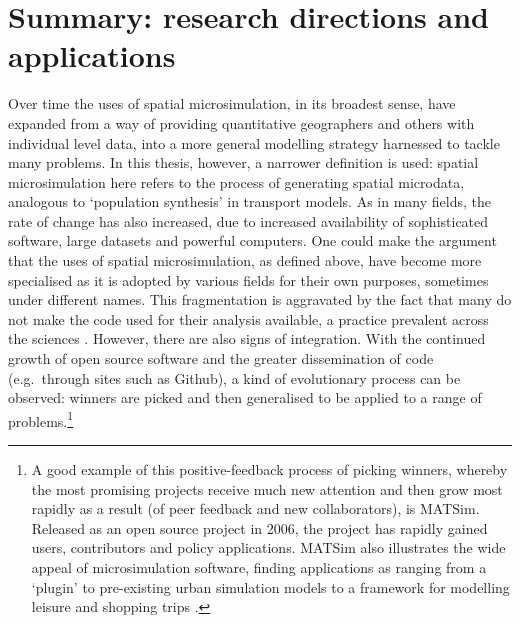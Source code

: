 \documentclass[a4paper, 11pt, twoside]{Thesis}
\begin{document}
\section{Summary: research directions and applications}
\label{s:bigdata-gps}
Over time the uses of spatial microsimulation, in its broadest sense,
have expanded from a way of
providing quantitative geographers and others with individual level data, into a more
general modelling strategy harnessed to tackle many problems.
In this thesis, however, a narrower definition is used:
spatial microsimulation here refers to the process of generating spatial
microdata, analogous to `population synthesis' in transport models.
As in many fields, the
rate of change has also increased, due to increased availability of
sophisticated software, large datasets and powerful
computers. One could make the argument that the
uses of spatial microsimulation, as defined above, have become more specialised
as it is adopted by various fields for their own purposes, sometimes under
different names. This fragmentation is aggravated by the fact that
many do not make the code used for their analysis available, a
practice prevalent across the sciences \citep{Ince2012}.
However, there are also signs of integration. With the continued growth of
open source software and the greater dissemination of code
(e.g.~through sites such as Github), a kind of evolutionary process can be observed:
winners are picked and then generalised to be applied to a range of
problems.\footnote{A
good example of this positive-feedback process of picking winners, whereby
the most promising projects receive much new attention and then grow most
rapidly as a result (of peer feedback and new collaborators), is MATSim.
Released as an open source project in 2006, the project has rapidly gained
users, contributors and policy applications. MATSim also illustrates the
wide appeal of microsimulation software, finding applications as ranging from
a `plugin' to pre-existing urban simulation models to a framework for
modelling leisure and shopping trips \citep{Nicolai2012-matsim, horni2009location}.
}
\end{document}
